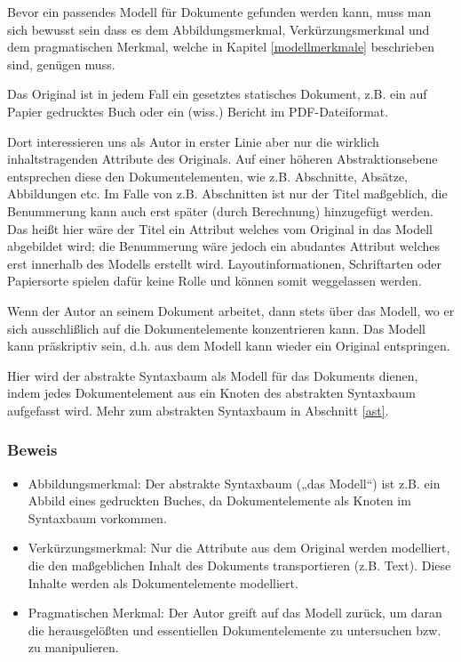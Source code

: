 Bevor ein passendes Modell für Dokumente gefunden werden kann, muss man sich bewusst sein dass es dem Abbildungsmerkmal, Verkürzungsmerkmal und dem pragmatischen Merkmal, welche in Kapitel \ref{modellmerkmale} beschrieben sind, genügen muss.

 
Das Original ist in jedem Fall ein gesetztes statisches Dokument, z.B. ein auf Papier gedrucktes Buch oder ein (wiss.) Bericht im PDF-Dateiformat.

 
Dort interessieren uns als Autor in erster Linie aber nur die wirklich inhaltstragenden Attribute des Originals. Auf einer höheren Abstraktionsebene entsprechen diese den Dokumentelementen, wie z.B. Abschnitte, Absätze, Abbildungen etc. Im Falle von z.B. Abschnitten ist nur der Titel maßgeblich, die Benummerung kann auch erst später (durch Berechnung) hinzugefügt werden. Das heißt hier wäre der Titel ein Attribut welches vom Original in das Modell abgebildet wird; die Benummerung wäre jedoch ein abudantes Attribut welches erst innerhalb des Modells erstellt wird. Layoutinformationen, Schriftarten oder Papiersorte spielen dafür keine Rolle und können somit weggelassen werden.

 
Wenn der Autor an seinem Dokument arbeitet, dann stets über das Modell, wo er sich ausschlißlich auf die Dokumentelemente konzentrieren kann. Das Modell kann präskriptiv sein, d.h. aus dem Modell kann wieder ein Original entspringen.

 
Hier wird der abstrakte Syntaxbaum als Modell für das Dokuments dienen, indem jedes Dokumentelement aus ein Knoten des abstrakten Syntaxbaum aufgefasst wird. Mehr zum abstrakten Syntaxbaum in Abschnitt \ref{ast}.

 
\subsubsection{Beweis}\label{}

 
\begin{itemize}

\item
Abbildungsmerkmal: Der abstrakte Syntaxbaum („das Modell“) ist z.B. ein Abbild eines gedruckten Buches, da Dokumentelemente als Knoten im Syntaxbaum vorkommen.


\item
Verkürzungsmerkmal: Nur die Attribute aus dem Original werden modelliert, die den maßgeblichen Inhalt des Dokuments transportieren (z.B. Text). Diese Inhalte werden als Dokumentelemente modelliert.


\item
Pragmatischen Merkmal: Der Autor greift auf das Modell zurück, um daran die herausgelößten und essentiellen Dokumentelemente zu untersuchen bzw. zu manipulieren.


\end{itemize}
 
